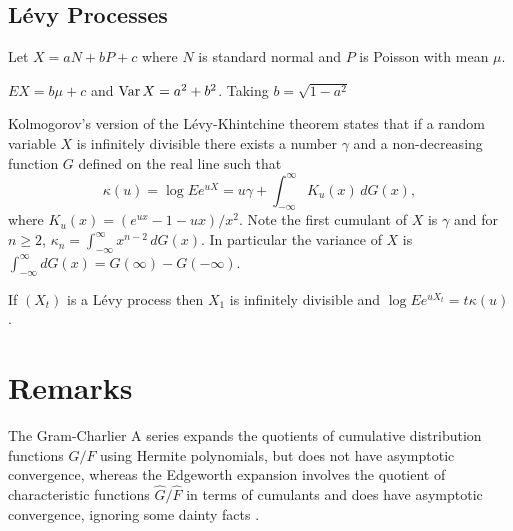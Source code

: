 \documentclass[11pt]{article}
\newcommand{\Var}{\mathop{\rm{Var}}}
\theoremstyle{remark}
\begin{document}
\subsection{L\'evy Processes}

Let \(X = aN + bP + c\) where \(N\) is standard normal and \(P\)
is Poisson with mean \(\mu\).

\(EX = b\mu + c\) and \(\Var X = a^2 + b^2\). Taking
\(b = \sqrt{1 - a^2}\)

Kolmogorov's version of the L\'evy-Khintchine theorem\cite{?}
states that if a random variable \(X\) is infinitely divisible
there exists a number \(\gamma\) and a non-decreasing function
\(G\) defined on the real line such that
\[
\kappa(u) = \log Ee^{uX} = u\gamma + \int_{-\infty}^\infty K_u(x)\,dG(x),
\]
where \(K_u(x) = (e^{ux} - 1 - ux)/x^2\). Note the first
cumulant of \(X\) is \(\gamma\) and for \(n\ge 2\),
\(\kappa_n = \int_{-\infty}^\infty x^{n-2}\,dG(x)\). In particular
the variance of \(X\) is 
\(\int_{-\infty}^\infty dG(x) = G(\infty) - G(-\infty)\).

If \((X_t)\) is a L\'evy process then \(X_1\) is
infinitely divisible and \(\log Ee^{uX_t} = t\kappa(u)\).

%

\section{Remarks}
The Gram-Charlier A series expands the quotients of cumulative
distribution functions \(G/F\) using Hermite polynomials,
but does not have asymptotic convergence, whereas the Edgeworth expansion
involves the quotient of characteristic functions 
\(\hat G/\hat F\) in terms of cumulants and does have asymptotic convergence, ignoring some dainty facts \cite{Petrov}.
\end{document}
